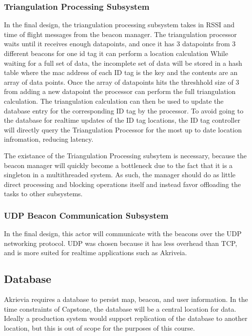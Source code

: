 \bigskip
\subsubsection{Triangulation Processing Subsystem}
In the final design, the triangulation processing subsystem takes in RSSI and time of flight messages from the beacon manager.
The triangulation processor waits until it receives enough datapoints, and once it has 3 datapoints from 3 different beacons for one id tag it can perform a location calculation
While waiting for a full set of data, the incomplete set of data will be stored in a hash table where the mac address of each ID tag is the key and the contents are an array of data points.
Once the array of datapoints hits the threshhold size of 3 from adding a new datapoint the processor can perform the full triangulation calculation.
The triangulation calculation can then be used to update the database entry for the corresponding ID tag by the processor.
To avoid going to the database for realtime updates of the ID tag locations, the ID tag controller will directly query the Triangulation Processor for the most up to date location infromation, reducing latency.

The existance of the Triangulation Processing subsytem is necessary, because the beacon manager will quickly become a bottleneck due to the fact that it is a singleton in a multithreaded system.
As such, the manager should do as little direct processing and blocking operations itself and instead favor offloading the tasks to other subsystems.

\bigskip
\subsubsection{UDP Beacon Communication Subsystem}
In the final design, this actor will communicate with the beacons over the UDP networking protocol.
UDP was chosen because it has less overhead than TCP, and is more suited for realtime applications such as Akriveia.

\bigskip
\subsection{Database}
Akrievia requires a database to persist map, beacon, and user information.
In the time constraints of Capstone, the database will be a central location for data.
Ideally a production system would support replication of the database to another location, but this is out of scope for the purposes of this course.

